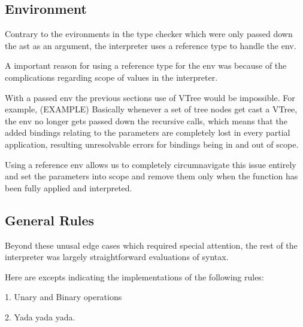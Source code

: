 \documentclass{l4proj}
\begin{document}
\subsection{Environment}

Contrary to the evironments in the type checker which were only passed down the ast as an argument, the interpreter uses a reference type to handle the env.

A important reason for using a reference type for the env was because of the complications regarding scope of values in the interpreter.

With a passed env the previous sections use of VTree would be impossible.
For example, (EXAMPLE) Basically whenever a set of tree nodes get cast a VTree, the env no longer gets passed down the recursive calls, which means that the added bindings relating to the parameters are completely lost in every partial application, resulting unresolvable errors for bindings being in and out of scope.

Using a reference env allows us to completely circumnavigate this issue entirely and set the parameters into scope and remove them only when the function has been fully applied and interpreted.

\subsection{General Rules}
Beyond these unusal edge cases which required special attention, the rest of the interpreter was largely straightforward evaluations of syntax.

Here are excepts indicating the implementations of the following rules:

1. Unary and Binary operations

2. Yada yada yada.





\end{document}
